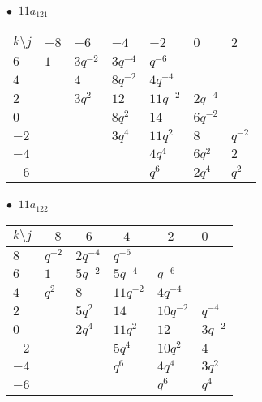 \begin{minipage}{\linewidth}
$\bullet\ $ $11a_{121}$ \vspace{0.5em} \\
\begin{tabular}{l|llllll}
$k \setminus j$ & $-8$ & $-6$ & $-4$ & $-2$ & $0$ & $2$ \\
\hline
$6$ & $1$ & $3q^{-2}$ & $3q^{-4}$ & $q^{-6}$ &  &  \\
$4$ &  & $4$ & $8q^{-2}$ & $4q^{-4}$ &  &  \\
$2$ &  & $3q^{2}$ & $12$ & $11q^{-2}$ & $2q^{-4}$ &  \\
$0$ &  &  & $8q^{2}$ & $14$ & $6q^{-2}$ &  \\
$-2$ &  &  & $3q^{4}$ & $11q^{2}$ & $8$ & $q^{-2}$ \\
$-4$ &  &  &  & $4q^{4}$ & $6q^{2}$ & $2$ \\
$-6$ &  &  &  & $q^{6}$ & $2q^{4}$ & $q^{2}$ \\
\end{tabular}
\vspace{2em}
\end{minipage}
%
\begin{minipage}{\linewidth}
$\bullet\ $ $11a_{122}$ \vspace{0.5em} \\
\begin{tabular}{l|lllll}
$k \setminus j$ & $-8$ & $-6$ & $-4$ & $-2$ & $0$ \\
\hline
$8$ & $q^{-2}$ & $2q^{-4}$ & $q^{-6}$ &  &  \\
$6$ & $1$ & $5q^{-2}$ & $5q^{-4}$ & $q^{-6}$ &  \\
$4$ & $q^{2}$ & $8$ & $11q^{-2}$ & $4q^{-4}$ &  \\
$2$ &  & $5q^{2}$ & $14$ & $10q^{-2}$ & $q^{-4}$ \\
$0$ &  & $2q^{4}$ & $11q^{2}$ & $12$ & $3q^{-2}$ \\
$-2$ &  &  & $5q^{4}$ & $10q^{2}$ & $4$ \\
$-4$ &  &  & $q^{6}$ & $4q^{4}$ & $3q^{2}$ \\
$-6$ &  &  &  & $q^{6}$ & $q^{4}$ \\
\end{tabular}
\vspace{2em}
\end{minipage}
%
